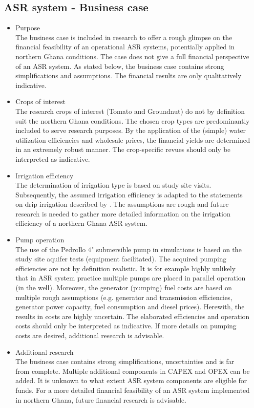 \subsection{ASR system - Business case} 
\begin{itemize}
\item{Purpose} \\
The business case is included in research to offer a rough glimpse on the financial feasibility of an operational ASR systems, potentially applied in northern Ghana conditions. The case does not give a full financial perspective of an ASR system. As stated below, the business case contains strong simplifications and assumptions. The financial results are only qualitatively indicative.
\item{Crops of interest} \\
The research crops of interest (Tomato and Groundnut) do not by definition suit the northern Ghana conditions. The chosen crop types are predominantly included to serve research purposes. By the application of the (simple) water utilization efficiencies and wholesale prices, the financial yields are determined in an extremely robust manner. The crop-specific revues should only be interpreted as indicative.
\item{Irrigation efficiency} \\
The determination of irrigation type is based on study site visits. Subsequently, the assumed irrigation efficiency is adapted to the statements on drip irrigation described by \citep{VandeGiesen2013}. The assumptions are rough and future research is needed to gather more detailed information on the irrigation efficiency of a northern Ghana ASR system. 
\item{Pump operation} \\
The use of the Pedrollo 4" submersible pump in simulations is based on the study site aquifer tests (equipment facilitated). The acquired pumping efficiencies are not by definition realistic. It is for example highly unlikely that in ASR system practice multiple pumps are placed in parallel operation (in the well). Moreover, the generator (pumping) fuel costs are based on multiple rough assumptions (e.g. generator and transmission efficiencies, generator power capacity, fuel consumption and diesel prices). Herewith, the results in costs are highly uncertain. The elaborated efficiencies and operation costs should only be interpreted as indicative. If more details on pumping costs are desired, additional research is advisable.  
\item{Additional research} \\
The business case contains strong simplifications, uncertainties and is far from complete. Multiple additional components in CAPEX and OPEX can be added. It is unknown to what extent ASR system components are eligible for funds. For a more detailed financial feasibility of an ASR system implemented in northern Ghana, future financial research is advisable. \\
\end{itemize}